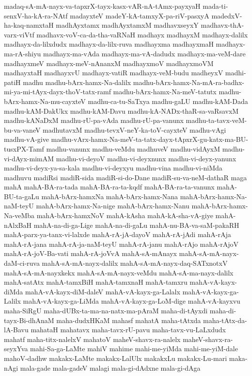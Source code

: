 {madaq-sA-mA-nayx-va-tapxrX-tayx-kasx-vAR-nA-tAmx-payxyaH
mada-ti-senxV-ha-kA-ra-NAtf
madayxteV
madeY-kA-tamxyX-pa-riV-pasxyA
madedxV-ha-kaq-namxtaH
madhAyxtamx
madhAyxtamxM
madhavxseyxY
madhavx-thA-varx-viVtf
madhavx-voV-ca-da-tha-vaRNaH
madhayx
madhayxM
madhayx-dalilx
madhayx-da-lilxdudx
madhayx-da-lilx-ruva
madhayxma
madhayxmaH
madhayx-ma-rA-shiyu
madhayx-ma-vAda
madhayx-ma-vA-dadudx
madhayx-ma-veM-dare
madhayxmeV
madhayx-meV-nAnanxM
madhayxmoV
madhayxmoVM
madhayxtaH
madhayxvU
madhayx-vatiR
madhayx-veM-budu
madheyxV
madhi-patiH
madhu
madhu-bArx-hamx-Na-dalilx
madhu-bArx-hamx-Na-mA-ra-badhx-mi-ya-mi-tAyx-dayx-thoV-tatx-ramf
madhu-bArx-hamx-Na-meV-tatutx
madhu-bArx-hamx-Na-mu-cayxteV
madhu-ca-tu-SaTxya
madhu-gaLU
madhu-kAM-Dada
madhu-kAM-DakUkx
madhu-kAM-Davu
madhu-kA-NADx-thaR-sa-vaRsavxM
madhu-kANaDxM
madhu-rU-pa-vAda
madhu-rU-pa-vanunx
madhu-ta-tavx-veM-bu-va-vaneV
madhutavxM
madhu-tevxV-neY-ka-toV-cayxteV
madhu-vAgi
madhu-vA-give
madhu-vArx-hamx-Na-meV-ta-tatx-dayx-tApxrX-gu-katx-ma-BU-tusxPX-Tamf
madhu-vanunx
madhu-veMdu
madhuveV
madhu-vidAyxM
madhu-vi-dAyx-mimAM
madhu-vi-deyoV
madhu-vi-deyxnunx
madhu-vi-deyx-yanunx
madhu-vi-deyx-ya-sa-kala
madhu-vi-deyxyu
madhu-vina
madhu-vi-niMda
madhuvu
madiRsi
madiR-sida
madiR-si-do-Dane
madiR-su-va-neM-dathaR
maga
mahA
mahA-BA-ra-tada
mahA-BA-ra-ta-kqdf
mahA-BA-ra-ta-vanunx
mahA-BU-ta-gaLu
mahA-bArx-hamxNa
mahA-bArx-hamx-Nana
mahA-bArx-hamx-Na-naM-teyU
mahA-bArx-hamx-Na-nige
mahA-bArx-hamx-Nanu
mahA-bArx-hamx-Na-veMba
mahA-bArx-hamxNoV
mahA-kAsha
mahA-kA-sha-vA-giye
mahA-nAlxBaH
mahA-na-di-ga-Lige
mahA-na-di-gaLu
mahA-nu-BA-va-saM-pakaRH
mahA-parx-ya-tanx-vi-lalxde
mahA-rA-jA-dayoV
mahA-rA-jAdi
mahA-rAja
mahA-rA-jana
mahA-rA-ja-naM-teyU
mahA-rA-janu
mahA-rAjo
mahA-rAjoV
mahA-rA-joV-Ba-vati
mahA-rA-joVvA
mahA-sA-mAnayx
mahA-sA-mA-nayx-daM-ci-ruva
mahA-sA-mA-nayx-dalilx
mahA-sA-mA-nayx-daq-SATxnotxV
mahA-sA-mA-nayxkekx
mahA-sA-mA-nayx-veMdu
mahA-sA-ma-nayx-dalilx
mahA-satAtx
mahA-tamxBiH
mahA-tamxnaH
mahA-tamxru
mahA-vA-kayx-diMda
mahA-vA-kayx-diM-daleV
mahA-vA-kayx-ga-Lalalx
mahA-vA-kayx-ga-Lalilx
mahA-vA-kayx-ga-LiMda
mahA-vA-kayx-ga-LoM-dige
mahA-vA-kayxvu
maha-SiRgU
maha-dUBx-ta-ma-na-natx-ma-pAraM
maha-di-tAyxdi
maha-di-tayx-Bi-dhAnaM
maha-dudxHKaM
mahasf
mahatA
maha-tAtxda
maha-tAtx-da-lA-Bavu
mahataH
mahatavx
maha-tavx-rU-pavu
maha-tavx-vu-LaLxdudx
mahatf
maha-titx-nalelxV
mahatoV
maheV-shavx-ra-nalelx
maheV-shavx-ra-seyxYva
mahi-Sa-ga-LaMte
mahiV
mahime
mahi-me-yiMda
mahi-me-yiM-dale
mahoV-dadhw
makakx-LaMte
makakx-LalUlx
makakxLu
makakx-Lu-mari
maka-nAgi
mala-gade
mala-gadeV
malagi
mala-gi-dAdxne
mala-gi-dAga
}
